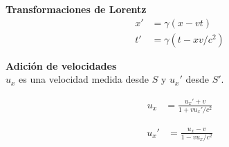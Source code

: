 \documentclass[12pt]{article}
\begin{document}
\textbf{Transformaciones de Lorentz}\\



\begin{align*}
x' &= \gamma\left(x - vt\right)\\
t' &= \gamma\left(t - xv/c^2\right)
\end{align*}

\textbf{Adición de velocidades}\\
$u_x$ es una velocidad medida desde $S$ y $u_x'$ desde $S'$. 

\begin{align*}
u_x &= \frac{u_x'+v}{1+vu_x'/c^2}
\end{align*}

\begin{align*}
u_x' &= \frac{u_x- v}{1-vu_x/c^2}
\end{align*}
\end{document}
